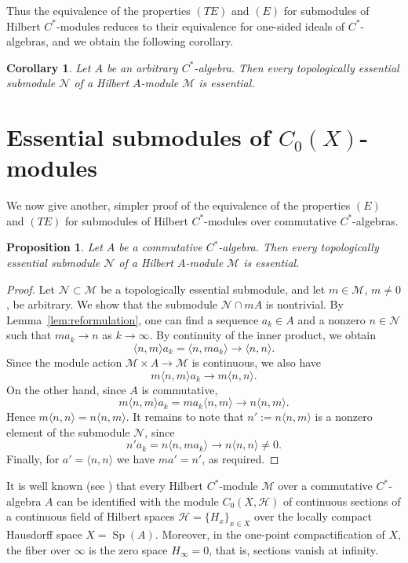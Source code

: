 \documentclass[reqno,a4paper,12pt]{amsart}
\theoremstyle{plain}
\newtheorem{corollary}[theorem]{Corollary}
\newtheorem{proposition}[theorem]{Proposition}
\theoremstyle{definition}
\newcommand{\inner}[2]{\langle #1, #2 \rangle}
\newcommand{\M}{\mathcal M}
\newcommand{\N}{\mathcal N}
\begin{document}
	Thus the equivalence of the properties $(TE)$ and $(E)$ for submodules of Hilbert $C^*$-modules reduces to their equivalence for one-sided ideals of $C^*$-algebras, and we obtain the following corollary.
	\begin{corollary}
		\label{thm:main_modules}
		Let $A$ be an arbitrary $C^*$-algebra.
		Then every topologically essential submodule $\N$ of a Hilbert $A$-module $\M$ is essential. 
	\end{corollary}
	
	\section{Essential submodules of $C_0(X)$-modules}
	\label{sec:fields}
	We now give another, simpler proof of the equivalence of the properties $(E)$ and $(TE)$ for submodules of Hilbert $C^*$-modules over commutative $C^*$-algebras.
	\begin{proposition}
		Let $A$ be a commutative $C^*$-algebra.
		Then every topologically essential submodule $\N$ of a Hilbert $A$-module $\M$ is essential.
	\end{proposition}
	\begin{proof}
		Let $\N \subset \M$ be a topologically essential submodule, and let $m \in \M$, $m \ne 0$, be arbitrary.
		We show that the submodule $\N \cap mA$ is nontrivial.
		By Lemma~\ref{lem:reformulation}, one can find a sequence $a_k \in A$ and a nonzero $n \in \N$ such that $ma_k \to n$ as $k \to \infty$.
		By continuity of the inner product, we obtain
		\[ \inner{n}{m}a_k = \inner{n}{ma_k} \to \inner{n}{n}. \]
		Since the module action $\M \times A \to \M$ is continuous, we also have
		\[ m\inner{n}{m}a_k \to m\inner{n}{n}. \]
		On the other hand, since $A$ is commutative,
		\[ m\inner{n}{m}a_k = ma_k\inner{n}{m} \to n\inner{n}{m}. \]
		Hence $m\inner{n}{n} = n\inner{n}{m}$. It remains to note that $n' := n\inner{n}{m}$ is a nonzero element of the submodule $\N$, since 
		\[ n'a_k = n\inner{n}{ma_k} \to n\inner{n}{n} \ne 0. \]
		Finally, for $a' = \inner{n}{n}$ we have $ma' = n'$, as required.
	\end{proof}
	
	It is well known (see \cite{takahashi}) that every Hilbert $C^*$-module $\M$ over a commutative $C^*$-algebra $A$ can be identified with the module $C_0(X,\mathcal H)$ of continuous sections of a continuous field of Hilbert spaces $\mathcal H=\{H_x\}_{x\in X}$ over the locally compact Hausdorff space $X=\operatorname{Sp}(A)$.
	Moreover, in the one-point compactification of $X$, the fiber over $\infty$ is the zero space $H_\infty=0$, that is, sections vanish at infinity.
	
\end{document}
